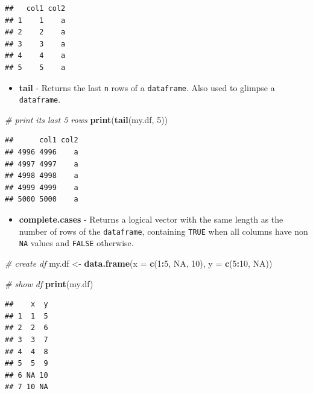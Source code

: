 \documentclass[11pt,]{book}
\newenvironment{Shaded}{\begin{snugshade}}{\end{snugshade}}
\newcommand{\KeywordTok}[1]{\textcolor[rgb]{0.27,0.27,0.27}{\textbf{#1}}}
\newcommand{\DataTypeTok}[1]{\textcolor[rgb]{0.27,0.27,0.27}{#1}}
\newcommand{\DecValTok}[1]{\textcolor[rgb]{0.06,0.06,0.06}{#1}}
\newcommand{\StringTok}[1]{\textcolor[rgb]{0.5,0.5,0.5}{#1}}
\newcommand{\CommentTok}[1]{\textcolor[rgb]{0.56,0.35,0.01}{\textit{#1}}}
\newcommand{\OtherTok}[1]{\textcolor[rgb]{0.56,0.35,0.01}{#1}}
\newcommand{\OperatorTok}[1]{\textcolor[rgb]{0.81,0.36,0.00}{\textbf{#1}}}
\newcommand{\NormalTok}[1]{#1}
\providecommand{\tightlist}{%
  \setlength{\itemsep}{0pt}\setlength{\parskip}{0pt}}
\begin{document}
\begin{verbatim}
##   col1 col2
## 1    1    a
## 2    2    a
## 3    3    a
## 4    4    a
## 5    5    a
\end{verbatim}

\begin{itemize}
\tightlist
\item
  \textbf{tail} - Returns the last \texttt{n} rows of a
  \texttt{dataframe}. Also used to glimpse a \texttt{dataframe}.
\end{itemize}

\begin{Shaded}
\begin{Highlighting}[]
\CommentTok{# print its last 5 rows}
\KeywordTok{print}\NormalTok{(}\KeywordTok{tail}\NormalTok{(my.df, }\DecValTok{5}\NormalTok{))}
\end{Highlighting}
\end{Shaded}

\begin{verbatim}
##      col1 col2
## 4996 4996    a
## 4997 4997    a
## 4998 4998    a
## 4999 4999    a
## 5000 5000    a
\end{verbatim}

\begin{itemize}
\tightlist
\item
  \textbf{complete.cases} - Returns a logical vector with the same
  length as the number of rows of the \texttt{dataframe}, containing
  \texttt{TRUE} when all columns have non \texttt{NA} values and
  \texttt{FALSE} otherwise. 
\end{itemize}

\begin{Shaded}
\begin{Highlighting}[]
\CommentTok{# create df}
\NormalTok{my.df <-}\StringTok{ }\KeywordTok{data.frame}\NormalTok{(}\DataTypeTok{x =} \KeywordTok{c}\NormalTok{(}\DecValTok{1}\OperatorTok{:}\DecValTok{5}\NormalTok{, }\OtherTok{NA}\NormalTok{, }\DecValTok{10}\NormalTok{),}
                    \DataTypeTok{y =} \KeywordTok{c}\NormalTok{(}\DecValTok{5}\OperatorTok{:}\DecValTok{10}\NormalTok{, }\OtherTok{NA}\NormalTok{))}

\CommentTok{# show df}
\KeywordTok{print}\NormalTok{(my.df)}
\end{Highlighting}
\end{Shaded}

\begin{verbatim}
##    x  y
## 1  1  5
## 2  2  6
## 3  3  7
## 4  4  8
## 5  5  9
## 6 NA 10
## 7 10 NA
\end{verbatim}
\end{document}
